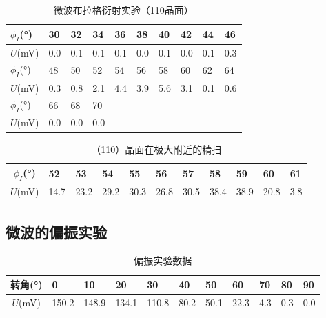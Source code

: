 \documentclass[zihao=5, UTF8]{article}
\theoremstyle{MyLineTheoremStyle} %
\theoremstyle{MyBlockTheoremStyle} %
\theoremstyle{MySubsubsectionStyle} %
\begin{document}
\begin{table}[H]
    \centering
    \begin{tabularx}{\textwidth}{|X|*{9}{X|}} %
        \hline
        \(\phi_I\)(°) & 30 & 32 & 34 & 36 & 38 & 40 & 42 & 44 & 46 \\ %
        \hline
        \(U\)(mV) & 0.0 & 0.1 & 0.1 & 0.1 & 0.0 & 0.1 & 0.0 & 0.1 & 0.3 \\ %
        \hline
        \(\phi_I\)(°) & 48 & 50 & 52 & 54 & 56 & 58 & 60 & 62 & 64 \\ %
        \hline
        \(U\)(mV) & 0.3 & 0.8 & 2.1 & 4.4 & 3.9 & 5.6 & 3.1 & 0.1 & 0.6 \\ %
        \hline
        \(\phi_I\)(°) & 66 & 68 & 70 &  &  &  &  &  &  \\ %
        \hline
        \(U\)(mV) & 0.0 & 0.0 & 0.0 &  &  &  &  &  &  \\ %
        \hline
    \end{tabularx}
    \caption{微波布拉格衍射实验（110晶面）} %
    \label{微波布拉格衍射实验（110晶面）表} %
\end{table}

\begin{table}[H]
\centering
\begin{tabularx}{\textwidth}{|c|*{10}{X|}} %
    \hline
    \(\phi_I\)(°) & 52 & 53 & 54 & 55 & 56 & 57 & 58 & 59 & 60 & 61 \\
    \hline
    \(U\)(mV) & 14.7 & 23.2 & 29.2 & 30.3 & 26.8 & 30.5 & 38.4 & 38.9 & 20.8 & 3.8 \\
    \hline
\end{tabularx}
\caption{（110）晶面在极大附近的精扫}
\label{（110）晶面在极大附近的精扫表}
\end{table}

\subsection{微波的偏振实验}
\begin{table}[H]
\centering
\begin{tabularx}{\textwidth}{|c|*{10}{X|}} %
    \hline
    转角(°)   & 0   & 10   & 20   & 30   & 40   & 50   & 60   & 70   & 80   & 90   \\
    \hline
    \(U\)(mV) & 150.2 & 148.9 & 134.1 & 110.8 & 80.2 & 50.1 & 22.3 & 4.3 & 0.3 & 0.0 \\
    \hline
\end{tabularx}
\caption{偏振实验数据}
\label{偏振实验数据表}
\end{table}
\end{document}
